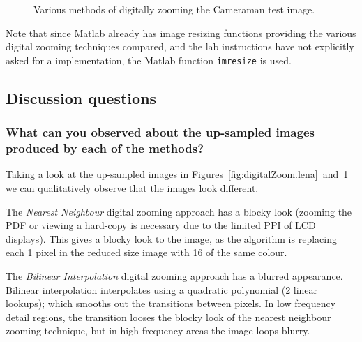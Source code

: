 \documentclass[article, 1.5space, letterpaper, 12pt, oneside, header, footer]{SydeClass}
\begin{document}
\begin{figure}[ht]

\centering
	\caption{Various methods of digitally zooming the Cameraman test image.}
	\label{fig:digitalZoom.cameraman}
\end{figure}

Note that since Matlab already has image resizing functions providing the various digital zooming techniques compared, and the lab instructions have not explicitly asked for a implementation, the Matlab function \texttt{imresize} is used.



\subsection{Discussion questions}

\subsubsection{What can you observed about the up-sampled images produced by each of the methods?}

Taking a look at the up-sampled images in Figures~\ref{fig:digitalZoom.lena}~and~\ref{fig:digitalZoom.cameraman} we can qualitatively observe that the images look different.

The \emph{Nearest Neighbour} digital zooming approach has a blocky look (zooming the PDF or viewing a hard-copy is necessary due to the limited PPI of LCD displays). This gives a blocky look to the image, as the algorithm is replacing each 1 pixel in the reduced size image with 16 of the same colour.

The \emph{Bilinear Interpolation} digital zooming approach has a blurred appearance. Bilinear interpolation interpolates using a quadratic polynomial (2 linear lookups); which smooths out the transitions between pixels. In low frequency detail regions, the transition looses the blocky look of the nearest neighbour zooming technique, but in high frequency areas the image loops blurry.
\end{document}
